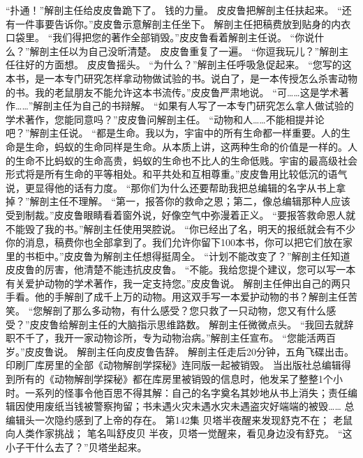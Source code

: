 \documentclass[a4paper,12pt,UTF8,twoside]{ctexbook}
\begin{document}
        “扑通！”解剖主任给皮皮鲁跪下了。 
        钱的力量。 
        皮皮鲁把解剖主任扶起来。 
        “还有一件事要告诉你。”皮皮鲁示意解剖主任坐下。 
        解剖主任把稿费放到贴身的内衣口袋里。 
        “我们得把您的著作全部销毁。”皮皮鲁看着解剖主任说。 
        “你说什么？”解剖主任以为自己没昕清楚。 
        皮皮鲁重复了一遍。 
        “你逗我玩儿？”解剖主任往好的方面想。 
        皮皮鲁摇头。 
        “为什么？”解剖主任呼吸急促起来。 
        “您写的这本书，是一本专门研究怎样拿动物做试验的书。说白了，是一本传授怎么杀害动物的书。我的老鼠朋友不能允许这本书流传。”皮皮鲁严肃地说。 
        “可……这是学术著作……”解剖主任为自己的书辩解。 
        “如果有人写了一本专门研究怎么拿人做试验的学术著作，您能同意吗？”皮皮鲁问解剖主任。 
        “动物和人……不能相提并论吧？”解剖主任说。 
        “都是生命。我以为，宇宙中的所有生命都一样重要。人的生命是生命，蚂蚁的生命同样是生命。从本质上讲，这两种生命的价值是一样的。人的生命不比蚂蚁的生命高贵，蚂蚁的生命也不比人的生命低贱。宇宙的最高级社会形式将是所有生命的平等相处。和平共处和互相尊重。”皮皮鲁用比较低沉的语气说，更显得他的话有力度。 
        “那你们为什么还要帮助我把总编辑的名字从书上拿掉？”解剖主任不理解。 
        “第一，报答你的救命之恩；第二，像总编辑那种人应该受到制裁。”皮皮鲁眼睛看着窗外说，好像空气中弥漫着正义。 
        “要报答救命恩人就不能毁了我的书。”解剖主任使用哭腔说。 
        “你已经出了名，明天的报纸就会有不少你的消息，稿费你也全部拿到了。我们允许你留下100本书，你可以把它们放在家里的书柜中。”皮皮鲁为解剖主任想得挺周全。 
        “计划不能改变了？”解剖主任知道皮皮鲁的厉害，他清楚不能违抗皮皮鲁。 
        “不能。我给您提个建议，您可以写一本有关爱护动物的学术著作，我一定支持您。”皮皮鲁说。 
        解剖主任伸出自己的两只手看。他的手解剖了成千上万的动物。用这双手写一本爱护动物的书？解剖主任苦笑。 
        “您解剖了那么多动物，有什么感受？您只救了一只动物，您又有什么感受？”皮皮鲁给解剖主任的大脑指示思维路数。 
        解剖主任微微点头。 
        “我回去就辞职不千了，我开一家动物诊所，专为动物治病。”解剖主任宣布。 
        “您能活两百岁。”皮皮鲁说。 
        解剖主任向皮皮鲁告辞。 
        解剖主任走后20分钟，五角飞碟出击。印刷厂库房里的全部《动物解剖学探秘》连同版一起被销毁。 
        当出版社总编辑得到所有的《动物解剖学探秘》都在库房里被销毁的信息时，他发呆了整整1个小时。一系列的怪事令他百思不得其解：自己的名字奠名其妙地从书上消失；责任编辑因使用废纸当钱被警察拘留；书未遇火灾未遇水灾未遇盗灾好端端的被毁…… 
        总编辑头一次隐约感到了上帝的存在。   第142集 
        贝塔半夜醒来发现舒克不在； 
        老鼠向人类作家挑战； 
        笔名叫舒皮贝   
        半夜，贝塔一觉醒来，看见身边没有舒克。 
        “这小子干什么去了？”贝塔坐起来。 
\end{document}
